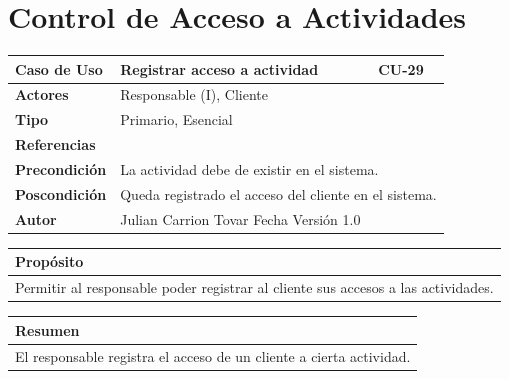 \usepackage{multirow}
\usepackage{tabularx}
\renewcommand\tabularxcolumn[1]{m{#1}} %
\usepackage{array}

\geometry{a4paper, margin=1in}

\setlength{\parindent}{0pt}
\setlength{\parskip}{0pt}
\renewcommand{\arraystretch}{1.3}


\chapter{Control de Acceso a Actividades}

\begin{table}[h!]
\centering
\begin{tabularx}{\textwidth}{|l|X|X|}
\hline
\textbf{Caso de Uso} & Registrar acceso a actividad & CU-29 \\ \hline
\textbf{Actores} & \multicolumn{2}{l|}{Responsable (I), Cliente} \\ \hline
\textbf{Tipo} & \multicolumn{2}{l|}{Primario, Esencial} \\ \hline
\textbf{Referencias} & \multicolumn{2}{l|}{} \\ \hline
\textbf{Precondición} & \multicolumn{2}{l|}{La actividad debe de existir en el sistema.} \\ \hline
\textbf{Poscondición} & \multicolumn{2}{l|}{Queda registrado el acceso del cliente en el sistema.} \\ \hline
\textbf{Autor} & \multicolumn{2}{l|}{Julian Carrion Tovar \hfill Fecha \hfill Versión 1.0} \\ \hline
\end{tabularx}
\end{table}

\vspace{0.2cm}

\begin{table}[h!]
\centering
\begin{tabularx}{\textwidth}{|X|}
\hline
\cellcolor[HTML]{F2F2F2}\textbf{Propósito} \\ \hline
Permitir al responsable poder registrar al cliente sus accesos a las actividades. \\ \hline
\end{tabularx}
\end{table}

\vspace{0.2cm}

\begin{table}[h!]
\centering
\begin{tabularx}{\textwidth}{|X|}
\hline
\cellcolor[HTML]{F2F2F2}\textbf{Resumen} \\ \hline
El responsable registra el acceso de un cliente a cierta actividad. \\ \hline
\end{tabularx}
\end{table}

